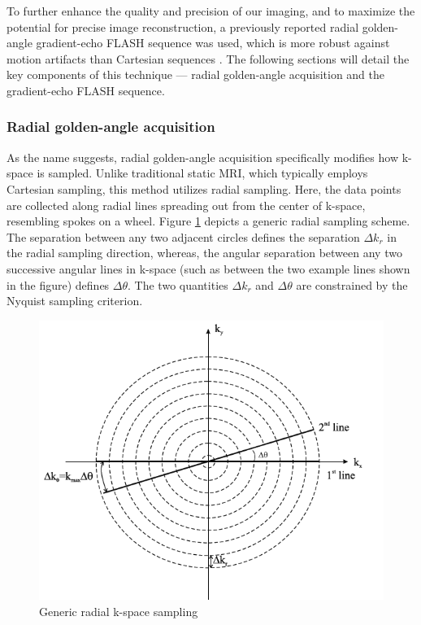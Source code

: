 \documentclass{micro-econ-thesis}
\begin{document}
  
To further enhance the quality and precision of our imaging, and to maximize the potential for precise image reconstruction, a previously reported radial golden-angle gradient-echo FLASH sequence was used, which is more robust against motion artifacts than Cartesian sequences \parencite{aleksiev_high-resolution_2022}. The following sections will detail the key components of this technique — radial golden-angle acquisition and the gradient-echo FLASH sequence.

\subsubsection{Radial golden-angle acquisition}


As the name suggests, radial golden-angle acquisition specifically modifies how k-space is sampled. Unlike traditional static MRI, which typically employs Cartesian sampling, this method utilizes radial sampling. Here, the data points are collected along radial lines spreading out from the center of k-space, resembling spokes on a wheel. Figure \ref{fig:radial} depicts a generic radial sampling scheme. The separation between any two adjacent circles defines the separation $\Delta k_r$ in the radial sampling direction, whereas, the angular separation between any two successive angular lines in k-space (such as between the two example lines shown in the figure) defines $\Delta \theta$. The two quantities $\Delta k_r$ and $\Delta \theta$ are constrained by the Nyquist sampling criterion. \parencite{brown_magnetic_2014} 
  
 \begin{figure}[H]
 	\centering
 	\includegraphics[width=0.7\linewidth]{radial}
 	\caption{Generic radial k-space sampling \parencite[p.306]{brown_magnetic_2014}}
 	\label{fig:radial}
 \end{figure}
 
\end{document}
